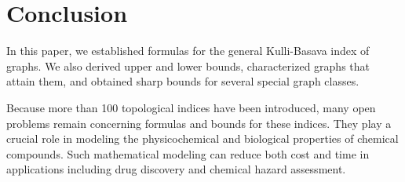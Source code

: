 \documentclass[11pt, oneside]{amsart}   	%
\theoremstyle{definition}
\theoremstyle{remark}
\numberwithin{equation}{section}
\begin{document}
\section{Conclusion}

In this paper, we established formulas for the general Kulli-Basava index of graphs. We also derived upper and lower bounds, characterized graphs that attain them, and obtained sharp bounds for several special graph classes.

Because more than 100 topological indices have been introduced, many open problems remain concerning formulas and bounds for these indices. They play a crucial role in modeling the physicochemical and biological properties of chemical compounds. Such mathematical modeling can reduce both cost and time in applications including drug discovery and chemical hazard assessment.



%










\end{document}
